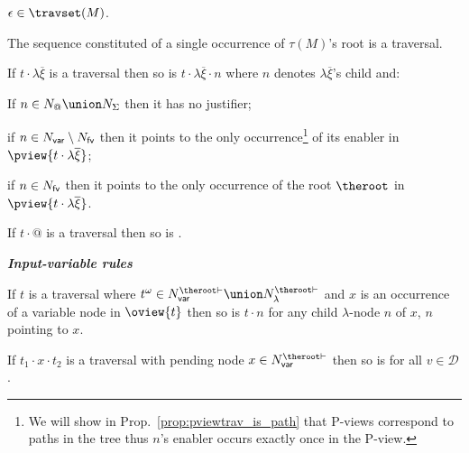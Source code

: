 \begin{FramedTable}
\begin{description}
\item{} $\epsilon \in \travset(M)$.
\item{} The sequence constituted of a single occurrence of $\tau(M)$'s root is a traversal.
\end{description}

\begin{description}
    \item {} If $t \cdot \lambda \overline{\xi}$ is a traversal then so is
        $t \cdot \lambda \overline{\xi} \cdot n$ where $n$ denotes
        $\lambda \overline{\xi}$'s child and:
        \begin{compactitem}
            \item If $n \in N_@ \union N_\Sigma$ then it has no justifier;
            \item if  $n \in N_{\sf var}\setminus N_{\sf fv}$ then it points to the only occurrence\footnote{We will show in
            Prop.\ \ref{prop:pviewtrav_is_path} that P-views correspond to
            paths in the tree thus $n$'s enabler occurs exactly once in the
            P-view.} of its enabler in
            $\pview{t\cdot \lambda \overline{\xi}}$;
            \item if  $n \in N_{\sf fv}$ then it points
            to the only occurrence of the root $\theroot$ in
            $\pview{t \cdot \lambda \overline{\xi}}$.
        \end{compactitem}
    \item {} If $t \cdot @$ is a traversal then so is .
\end{description}

\emph{\bf Input-variable rules}
\begin{description}
\item {} If $t$ is a traversal where $t^\omega \in N_{\sf var}^{\theroot\vdash} \union N_\lambda^{\theroot\vdash}$
and $x$ is an occurrence of a variable node in $\oview{t}$ then so is $t \cdot n$ for any child $\lambda$-node $n$ of $x$, $n$ pointing to $x$.



\item {} If $t_1
\cdot x \cdot t_2$ is a traversal with pending node $x \in
N_{\sf var}^{\theroot\vdash}$ then so is  for all $v \in
\mathcal{D}$.
\end{description}


\end{FramedTable}
